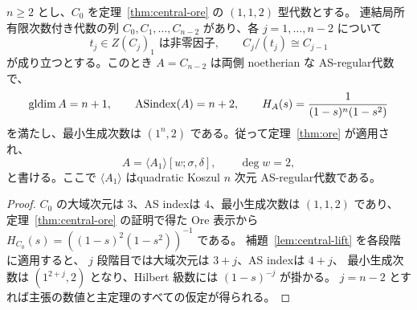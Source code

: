 \begin{corollary}\label{cor:iterated-central}
$n\ge2$ とし、$C_0$ を定理~\ref{thm:central-ore} の $(1,1,2)$ 型代数とする。
連結局所有限次数付き代数の列 $C_0,C_1,\ldots,C_{n-2}$ があり、各 $j=1,\ldots,n-2$ について
\[
  t_j\in Z(C_j)_1\text{ は非零因子},\qquad
  C_j/(t_j)\cong C_{j-1}
\]
が成り立つとする。このとき $A=C_{n-2}$ は両側 noetherian な AS-regular代数で、
\[
 \operatorname{gldim} A=n+1,\qquad
 \operatorname{ASindex}(A)=n+2,\qquad
 H_A(s)=\frac1{(1-s)^n(1-s^2)}
\]
を満たし、最小生成次数は $(1^n,2)$ である。従って定理~\ref{thm:ore} が適用され、
\[
 A=\langle A_1\rangle[w;\sigma,\delta],\qquad \deg w=2,
\]
と書ける。ここで $\langle A_1\rangle$ はquadratic Koszul $n$ 次元 AS-regular代数である。
\end{corollary}

\begin{proof}
$C_0$ の大域次元は $3$、AS indexは $4$、最小生成次数は $(1,1,2)$ であり、
定理~\ref{thm:central-ore} の証明で得た Ore 表示から
$H_{C_0}(s)=((1-s)^2(1-s^2))^{-1}$ である。
補題~\ref{lem:central-lift} を各段階に適用すると、
$j$ 段階目では大域次元は $3+j$、AS indexは $4+j$、
最小生成次数は $(1^{2+j},2)$ となり、Hilbert 級数には $(1-s)^{-j}$ が掛かる。
$j=n-2$ とすれば主張の数値と主定理のすべての仮定が得られる。
\end{proof}
